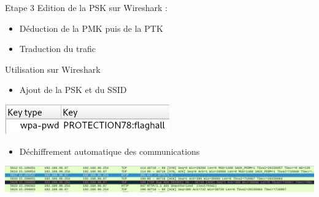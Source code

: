 \documentclass{beamer}
\begin{document}
	\begin{frame}
	\begin{block}{Etape 3}
		Edition de la PSK sur Wireshark :
		\begin{itemize}
			\item Déduction de la PMK puis de la PTK
			\item Traduction du trafic
		\end{itemize}
	\end{block}
	\begin{exampleblock}{Utilisation sur Wireshark}

			\begin{itemize}
				\item Ajout de la PSK et du SSID
			\end{itemize}
			\begin{center}
				\includegraphics[scale=0.6]{./pictures/118-wpa-forensics-wireshark-pwd.png}
			\end{center}
			\begin{itemize}
				\item Déchiffrement automatique des communications
			\end{itemize}
			\begin{center}
				\includegraphics[scale=0.25]{./pictures/118-wpa-forensics-wireshark-http.png}
			\end{center}

	\end{exampleblock}
	\end{frame}
\end{document}
